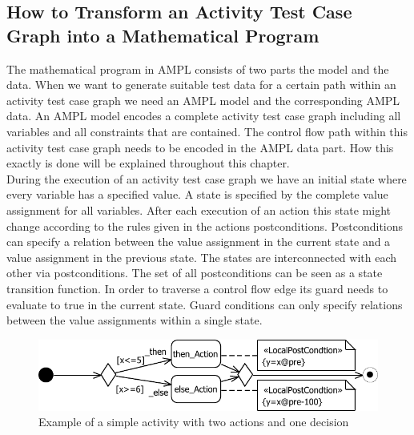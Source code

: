 \subsection{How to Transform an Activity Test Case Graph into a Mathematical Program}
The mathematical program in AMPL consists of two parts the model and the data. When we want to generate suitable test data for a certain path within an activity test case graph we need an AMPL model and the corresponding AMPL data. An AMPL model encodes a complete activity test case graph including all variables and all constraints that are contained. The control flow path within this activity test case graph needs to be encoded in the AMPL data part. How this exactly is done will be explained throughout this chapter.\\
During the execution of an activity test case graph we have an initial state where every variable has a specified value. A state is specified by the complete value assignment for all variables. After each execution of an action this state might change according to the rules given in the actions postconditions. Postconditions can specify a relation between the value assignment in the current state and a value assignment in the previous state. The states are interconnected with each other via postconditions. The set of all postconditions can be seen as a state transition function. In order to traverse a control flow edge its guard needs to evaluate to true in the current state. Guard conditions can only specify relations between the value assignments within a single state.\\ 
\begin{figure}
\includegraphics[width=\textwidth]{./pics/BasicExamples.pdf}
\caption{Example of a simple activity with two actions and one decision}
\label{fig:ActivityExample}
\end{figure}
